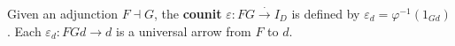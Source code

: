 Given an adjunction $F \dashv G$, the \textbf{counit} $\varepsilon: FG \xrightarrow{\cdot} I_D$ is defined by $\varepsilon_d = \varphi^{-1}(1_{Gd})$. Each $\varepsilon_d: FGd \rightarrow d$ is a universal arrow from $F$ to $d$.